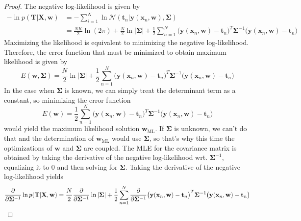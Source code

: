\vspace{1em}

\begin{proof}
    The negative log-likelihood is given by
    \begin{align*}
    -\ln p(\mathbf{T} | \mathbf{X}, \mathbf{w})
    &= -\sum_{i=1}^{N} \ln \mathcal{N}(\mathbf{t}_n | \mathbf{y}(\mathbf{x}_n, \mathbf{w}), \mathbf{\Sigma}) \\
    &= \frac{NK}{2} \ln(2\pi) + \frac{N}{2} \ln|\mathbf{\Sigma}| 
    + \frac{1}{2}  \sum_{n=1}^{N} \big(\mathbf{y}(\mathbf{x}_n, \mathbf{w}) - \mathbf{t}_n\big)^T
    \mathbf{\Sigma}^{-1}\big(\mathbf{y}(\mathbf{x}_n, \mathbf{w}) - \mathbf{t}_n\big)
    \end{align*}
    Maximizing the likelihood is equivalent to minimizing the negative
    log-likelihood. Therefore, the error function that must be minimized
    to obtain maximum likelihood is given by
    \[
        E(\mathbf{w}, \mathbf{\Sigma}) 
        = \frac{N}{2} \ln|\mathbf{\Sigma}|
        + \frac{1}{2}  \sum_{n=1}^{N} \big(\mathbf{y}(\mathbf{x}_n, \mathbf{w}) - \mathbf{t}_n\big)^T
        \mathbf{\Sigma}^{-1}\big(\mathbf{y}(\mathbf{x}_n, \mathbf{w}) - \mathbf{t}_n\big)
    \] 
    In the case when $\mathbf{\Sigma}$ is known, we can simply treat
    the determinant term as a constant, so minimizing
    the error function
    \[
        E(\mathbf{w}) = 
        \frac{1}{2}  \sum_{n=1}^{N} \big(\mathbf{y}(\mathbf{x}_n, \mathbf{w}) - \mathbf{t}_n\big)^T
        \mathbf{\Sigma}^{-1}\big(\mathbf{y}(\mathbf{x}_n, \mathbf{w}) - \mathbf{t}_n\big)
    \] 
    would yield the maximum likelihood solution $\mathbf{w}_\text{ML}$.
    If $ \mathbf{\Sigma}$ is unknown, we can't do that and the
    determination of $\mathbf{w}_{\text{ML}}$ would use $\mathbf{\Sigma}$,
    so that's why this time the optimizations of $\mathbf{w}$
    and $\mathbf{\Sigma}$ are coupled. The MLE for
    the covariance matrix is obtained by taking the
    derivative of the negative log-likelihood wrt. $\mathbf{\Sigma}^{-1}$, equalizing
    it to 0 and then solving for $\mathbf{\Sigma}$. Taking the
    derivative of the negative log-likelihood yields
    \begin{align*}
        \pdv{\mathbf{\Sigma}^{-1}} \ln p(\mathbf{T} | \mathbf{X}, \mathbf{w})
        &= \frac{N}{2} \pdv{\mathbf{\Sigma}^{-1}} \ln |\mathbf{\Sigma}| +
        \frac{1}{2}  \sum_{n=1}^{N} \pdv{\mathbf{\Sigma}^{-1}} 
        \big(\mathbf{y}(\mathbf{x}_n, \mathbf{w}) - \mathbf{t}_n\big)^T
        \mathbf{\Sigma}^{-1}\big(\mathbf{y}(\mathbf{x}_n, \mathbf{w}) - \mathbf{t}_n\big) \\

\end{align*}
\end{proof}
